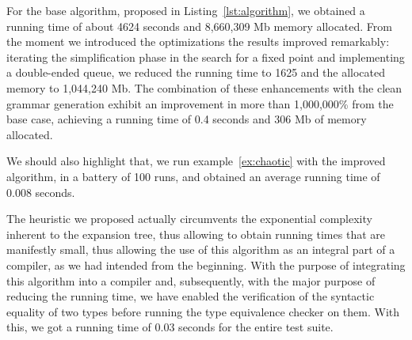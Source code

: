 For the base algorithm, proposed in Listing~\ref{lst:algorithm}, we
obtained a running time of about 4624 seconds and
8,660,309 Mb memory allocated. From the moment we introduced the
optimizations the results improved remarkably: iterating the
simplification phase in the search for a fixed point and implementing
a double-ended queue, we reduced the running time to 1625 and the 
allocated memory to 1,044,240 Mb. The 
combination of these enhancements with the clean grammar generation
exhibit an improvement in more than 1,000,000\% from the base case,
achieving a running time of 0.4 seconds and 306 Mb 
of memory allocated.


We should also highlight that, we run example~\eqref{ex:chaotic}
with the improved algorithm, in a battery of 100 runs, and obtained an
average running time of 0.008 seconds.

The heuristic we proposed actually circumvents the exponential complexity 
inherent to the expansion tree, thus allowing to obtain running times that 
are manifestly small, thus allowing the use of this algorithm as an integral 
part of a compiler, as we had intended from the beginning. 
%
With the purpose of integrating this algorithm into a compiler and, subsequently,
with the major purpose of reducing the running time,
we have enabled the verification of the syntactic equality of two types 
before running the type equivalence checker on them. 
With this, we got a running time of 0.03 seconds 
for the entire test suite.

